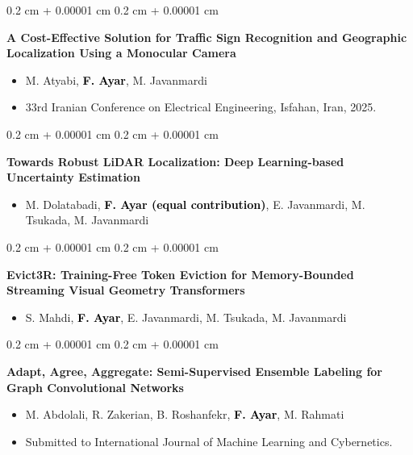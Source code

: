 \documentclass[10pt, letterpaper]{article}
\newenvironment{highlights}{
    \begin{itemize}[
        topsep=0.10 cm,
        parsep=0.10 cm,
        partopsep=0pt,
        itemsep=0pt,
        leftmargin=0.4 cm + 10pt
    ]
}{
    \end{itemize}
} %
\newenvironment{onecolentry}{
    \begin{adjustwidth}{
        0.2 cm + 0.00001 cm
    }{
        0.2 cm + 0.00001 cm
    }
}{
    \end{adjustwidth}
} %
\begin{document}
\begin{samepage}
        \begin{onecolentry}
            \textbf{A Cost-Effective Solution for Traffic Sign Recognition and Geographic Localization Using a Monocular Camera}
            \begin{highlights}
                \item \textcolor{secondaryColor}{M. Atyabi, \textcolor{black}{\textbf{F. Ayar}}, M. Javanmardi}
                \item \textcolor{secondaryColor}{33rd Iranian Conference on Electrical Engineering, Isfahan, Iran, 2025.}
            \end{highlights}
        \end{onecolentry}
        
        \begin{onecolentry}
            \textbf{Towards Robust LiDAR Localization: Deep Learning-based Uncertainty Estimation}
            \begin{highlights}
                \item \textcolor{secondaryColor}{M. Dolatabadi, \textcolor{black}{\textbf{F. Ayar (equal contribution)}}, E. Javanmardi, M. Tsukada, M. Javanmardi}
            \end{highlights}
        \end{onecolentry}
        
        \begin{onecolentry}
            \textbf{Evict3R: Training-Free Token Eviction for Memory-Bounded Streaming Visual Geometry Transformers}
            \begin{highlights}
                \item \textcolor{secondaryColor}{S. Mahdi, \textcolor{black}{\textbf{F. Ayar}}, E. Javanmardi, M. Tsukada, M. Javanmardi}
            \end{highlights}
        \end{onecolentry}
        
        \begin{onecolentry}
            \textbf{Adapt, Agree, Aggregate: Semi-Supervised Ensemble Labeling for Graph Convolutional Networks}
            \begin{highlights}
                \item \textcolor{secondaryColor}{M. Abdolali, R. Zakerian, B. Roshanfekr, \textcolor{black}{\textbf{F. Ayar}}, M. Rahmati}
                \item \textcolor{secondaryColor}{Submitted to International Journal of Machine Learning and Cybernetics.}
            \end{highlights}
        \end{onecolentry}
        
    \end{samepage}
\end{document}

